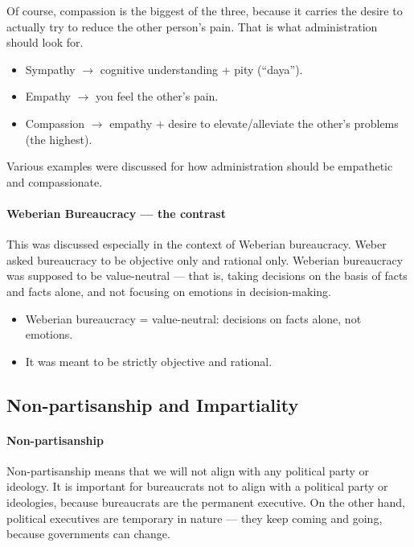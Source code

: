 Of course, compassion is the biggest of the three, because it carries the desire to actually try to reduce the other person's pain. That is what administration should look for.

\begin{ComparisonBox}
\begin{itemize}
\item Sympathy $\rightarrow$ cognitive understanding + pity (``daya'').
\item Empathy $\rightarrow$ you feel the other's pain.
\item Compassion $\rightarrow$ empathy + desire to elevate/alleviate the other's problems (the highest).
\end{itemize}
\end{ComparisonBox}

Various examples were discussed for how administration should be empathetic and compassionate.

\paragraph{Weberian Bureaucracy --- the contrast} This was discussed especially in the context of Weberian bureaucracy. Weber asked bureaucracy to be objective only and rational only. Weberian bureaucracy was supposed to be value-neutral --- that is, taking decisions on the basis of facts and facts alone, and not focusing on emotions in decision-making.

\begin{KeyConcept}
\begin{itemize}
\item Weberian bureaucracy = value-neutral: decisions on facts alone, not emotions.
\item It was meant to be strictly objective and rational.
\end{itemize}
\end{KeyConcept}

\subsection{Non-partisanship and Impartiality}

\paragraph{Non-partisanship} Non-partisanship means that we will not align with any political party or ideology. It is important for bureaucrats not to align with a political party or ideologies, because bureaucrats are the permanent executive. On the other hand, political executives are temporary in nature --- they keep coming and going, because governments can change.


